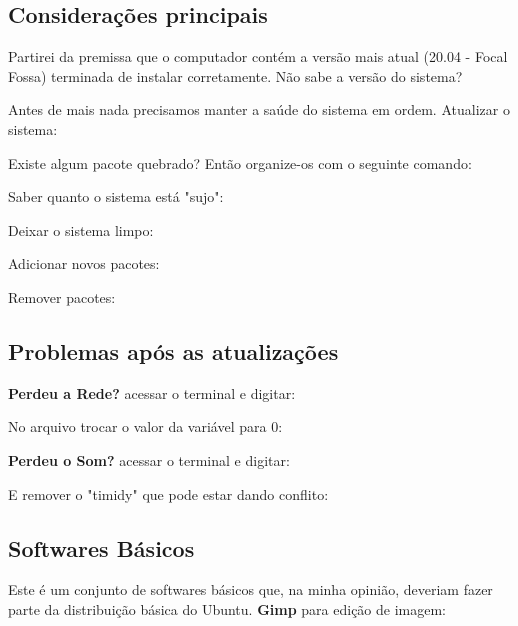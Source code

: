 \documentclass[a4paper,11pt]{article}
\begin{document}
\subsection{Considerações principais}
Partirei da premissa que o computador contém a versão mais atual (20.04 - Focal Fossa) terminada de instalar corretamente. Não sabe a versão do sistema? \\

Antes de mais nada precisamos manter a saúde do sistema em ordem. Atualizar o sistema: \\

Existe algum pacote quebrado? Então organize-os com o seguinte comando: \\

Saber quanto o sistema está "sujo": \\

Deixar o sistema limpo: \\

Adicionar novos pacotes: \\

Remover pacotes: \\

\subsection{Problemas após as atualizações}
\textbf{Perdeu a Rede?} acessar o terminal e digitar: \\

No arquivo trocar o valor da variável para 0: \\

\textbf{Perdeu o Som?} acessar o terminal e digitar: \\

E remover o "timidy" que pode estar dando conflito: \\

\subsection{Softwares Básicos}
Este é um conjunto de softwares básicos que, na minha opinião, deveriam fazer parte da distribuição básica do Ubuntu. \textbf{Gimp} para edição de imagem: \\
 \\
\end{document}
